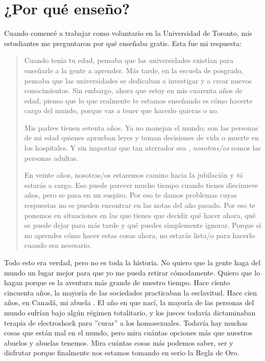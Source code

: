 \chapter{¿Por qué enseño?}\label{s:finale}

Cuando comencé a trabajar como voluntario en la Universidad de Toronto,
mis estudiantes me preguntaron por qué enseñaba gratis.
Esta fue mi respuesta:

\begin{quote}

Cuando tenía tu edad,
pensaba que las universidades existían para enseñarle a la gente a aprender.
Más tarde,
en la escuela de posgrado,
pensaba que las universidades se dedicaban a investigar y a crear nuevos conocimientos.
Sin embargo, ahora que estoy en mis cuarenta años de edad,
pienso que lo que realmente te estamos enseñando es
cómo hacerte cargo del mundo,
porque vas a tener que hacerlo quieras o no.

Mis padres tienen setenta años.
Ya no manejan el mundo;
son las personas de mi edad quienes aprueban leyes
y toman decisiones de vida o muerte en los hospitales.
Y sin importar que tan aterrador sea ,
\emph{nosotras/os} somos las personas adultas.

En veinte años,
nosotras/os estaremos camino hacia la jubilación y \emph{tú} estarás a cargo.
Eso puede parecer mucho tiempo cuando tienes diecinueve años,
pero se pasa en un suspiro.
Por eso te damos problemas cuyas respuestas no se pueden encontrar en las notas del año pasado.
Por eso te ponemos en situaciones en las que 
tienes que decidir qué hacer ahora, 
qué se puede dejar para más tarde
y qué puedes simplemente ignorar.
Porque si no aprendes cómo hacer estas cosas ahora,
no estarás lista/o para hacerlo cuando sea necesario.

\end{quote}

Todo esto era verdad,
pero no es toda la historia.
No quiero que la gente haga del mundo un lugar mejor para que yo me pueda retirar  cómodamente.
Quiero que lo hagan porque es la aventura más grande  de nuestro tiempo.
Hace ciento cincuenta años,
la mayoría de las sociedades practicaban la esclavitud.
Hace cien años, en Canadá,
mi abuela .
El año en que nací,
la mayoría de las personas del mundo sufrían bajo algún régimen  totalitario,
y los jueces todavía dictaminaban terapia de electroshock para ”curar'' a los homosexuales.
Todavía hay muchas cosas que están mal en el mundo,
pero mira cuántas opciones más que nuestros abuelos y abuelas tenemos. Mira cuántas cosas más podemos saber, ser y disfrutar
porque finalmente nos estamos tomando en serio la Regla de Oro.

